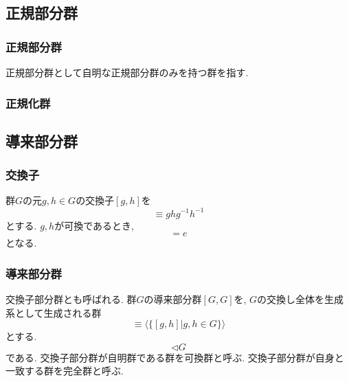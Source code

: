 \documentclass[11pt, a4paper]{jsarticle}
\begin{document}
\subsection{正規部分群}
\subsubsection{正規部分群}
正規部分群として自明な正規部分群のみを持つ群を指す.

\subsubsection{正規化群}

\subsection{導来部分群}
\subsubsection{交換子}
群$G$の元$g,h \in G$の交換子$[g,h]$を
\begin{equation}
	[g, h] \equiv g h g^{-1} h^{-1}
\end{equation}
とする.
$g,h$が可換であるとき, 
\begin{equation}
	[g, h] = e
\end{equation}
となる.

\subsubsection{導来部分群}
交換子部分群とも呼ばれる.
群$G$の導来部分群$[G,G]$を, $G$の交換し全体を生成系として生成される群
\begin{equation}
	[G, G] \equiv \langle \{ [g,h] | g,h \in G\} \rangle
\end{equation}
とする.
\begin{equation}
	[G, G] \triangleleft G
\end{equation}
である.
交換子部分群が自明群である群を可換群と呼ぶ.
交換子部分群が自身と一致する群を完全群と呼ぶ.
\end{document}
